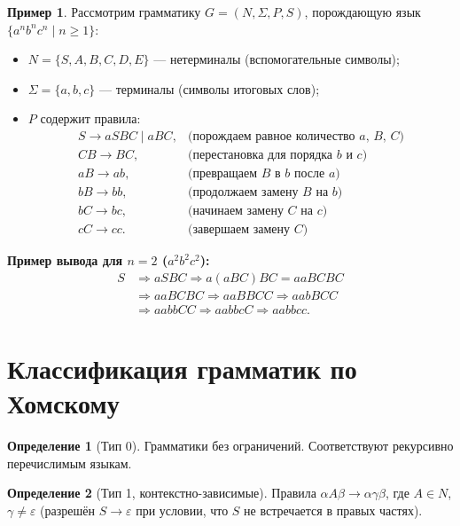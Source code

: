\documentclass[12pt,a4paper]{article}
\theoremstyle{definition}
\newtheorem{definition}{Определение}[section]
\newtheorem{example}{Пример}[section]
\newcommand{\emptystring}{\varepsilon}
\begin{document}
\begin{example}
Рассмотрим грамматику $G = (N, \Sigma, P, S)$, порождающую язык $\{a^n b^n c^n \mid n \ge 1\}$:
\begin{itemize}
\item $N = \{S, A, B, C, D, E\}$ --- нетерминалы (вспомогательные символы);
\item $\Sigma = \{a, b, c\}$ --- терминалы (символы итоговых слов);
\item $P$ содержит правила:
  \[
  \begin{array}{ll}
  S \to aSBC \mid aBC, & \text{(порождаем равное количество $a$, $B$, $C$)} \\
  CB \to BC,            & \text{(перестановка для порядка $b$ и $c$)} \\
  aB \to ab,            & \text{(превращаем $B$ в $b$ после $a$)} \\
  bB \to bb,            & \text{(продолжаем замену $B$ на $b$)} \\
  bC \to bc,            & \text{(начинаем замену $C$ на $c$)} \\
  cC \to cc.            & \text{(завершаем замену $C$)}
  \end{array}
  \]
\end{itemize}

\textbf{Пример вывода для $n=2$ ($a^2 b^2 c^2$):}
\[
\begin{aligned}
S &\Rightarrow aSBC \Rightarrow a(aBC)BC = aaBCBC \\
  &\Rightarrow aaB CBC \Rightarrow aaB BCC \Rightarrow aabBCC \\
  &\Rightarrow aabbCC \Rightarrow aabbcC \Rightarrow aabbcc.
\end{aligned}
\]
\end{example}

\section{Классификация грамматик по Хомскому}

\begin{definition}[Тип 0]
Грамматики без ограничений. Соответствуют рекурсивно перечислимым языкам.
\end{definition}

\begin{definition}[Тип 1, контекстно-зависимые]
Правила $\alpha A\beta \to \alpha\gamma\beta$, где $A\in N$, $\gamma\neq\emptystring$ (разрешён $S\to\emptystring$ при условии, что $S$ не встречается в правых частях).
\end{definition}
\end{document}
